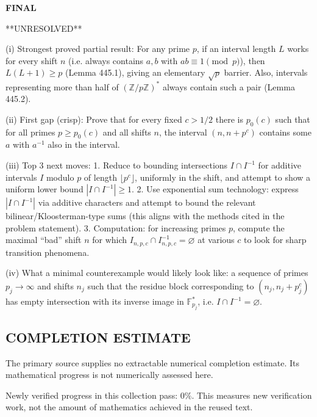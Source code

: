 \medskip
\noindent\textbf{FINAL}

**UNRESOLVED**

(i) Strongest proved partial result: For any prime $p$, if an interval length $L$ works for every shift $n$ (i.e. always contains $a,b$ with $ab\equiv1\pmod p$), then $L(L+1)\ge p$ (Lemma 445.1), giving an elementary $\sqrt p$ barrier. Also, intervals representing more than half of $(\mathbb Z/p\mathbb Z)^*$ always contain such a pair (Lemma 445.2).

(ii) First gap (crisp): Prove that for every fixed $c>1/2$ there is $p_0(c)$ such that for all primes $p\ge p_0(c)$ and all shifts $n$, the interval $(n,n+p^c)$ contains some $a$ with $a^{-1}$ also in the interval.

(iii) Top 3 next moves:
1. Reduce to bounding intersections $I\cap I^{-1}$ for additive intervals $I$ modulo $p$ of length $\lfloor p^c\rfloor$, uniformly in the shift, and attempt to show a uniform lower bound $|I\cap I^{-1}|\ge 1$.
2. Use exponential sum technology: express $|I\cap I^{-1}|$ via additive characters and attempt to bound the relevant bilinear/Kloosterman-type sums (this aligns with the methods cited in the problem statement).
3. Computation: for increasing primes $p$, compute the maximal ``bad'' shift $n$ for which $I_{n,p,c}\cap I_{n,p,c}^{-1}=\varnothing$ at various $c$ to look for sharp transition phenomena.

(iv) What a minimal counterexample would likely look like: a sequence of primes $p_j\to\infty$ and shifts $n_j$ such that the residue block corresponding to $(n_j,n_j+p_j^c)$ has empty intersection with its inverse image in $\mathbb F_{p_j}^*$, i.e. $I\cap I^{-1}=\varnothing$.




\subsection*{COMPLETION ESTIMATE}
The primary source supplies no extractable numerical completion estimate. Its mathematical progress is not numerically assessed here.

Newly verified progress in this collection pass: $0\%$. This measures new verification work, not the amount of mathematics achieved in the reused text.
